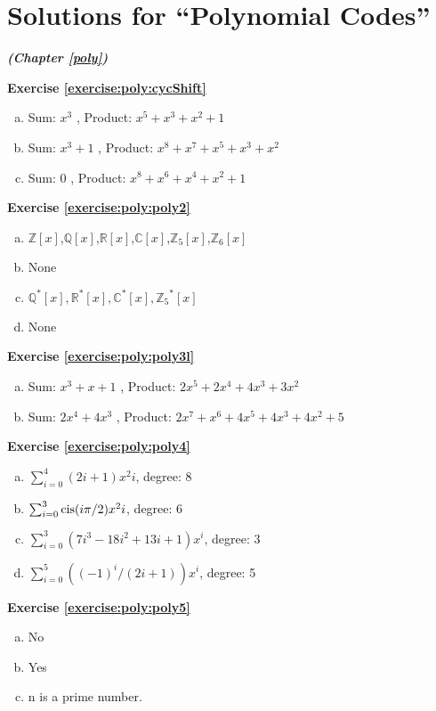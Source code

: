 \section{Solutions for ``Polynomial Codes''}
\noindent\textbf{\textit{ (Chapter \ref{poly})}}\bigskip

\noindent\textbf{Exercise \ref{exercise:poly:cycShift}}
\begin{enumerate} [(a)]
\item
 Sum: $x^3$ , Product: $x^5+x^3+x^2+1$
\item
 Sum: $x^3+1$ , Product: $x^8+x^7+x^5+x^3+x^2$
\item
 Sum: $0$ , Product: $x^8+x^6+x^4+x^2+1$
\end{enumerate}

\noindent\textbf{Exercise \ref{exercise:poly:poly2}}
\begin{enumerate} [(a)]
\item
 $\mathbb{Z}[x]$,$\mathbb{Q}[x]$,$\mathbb{R}[x]$,$\mathbb{C}[x]$,$\mathbb{Z}_5[x]$,$\mathbb{Z}_6[x]$
\item
 None
\item
 $\mathbb{Q}^*[x],\mathbb{R}^*[x], \mathbb{C}^*[x], {\mathbb{Z}_5}^*[x]$
\item
 None
\end{enumerate}

\noindent\textbf{Exercise \ref{exercise:poly:poly3l}}
\begin{enumerate} [(a)]
\item
 Sum: $x^3+x+1$ , Product: $2x^5+2x^4+4x^3+3x^2$
\item
 Sum: $2x^4+4x^3$ , Product: $2x^7+x^6+4x^5+4x^3+4x^2+5$
\end{enumerate}

\noindent\textbf{Exercise \ref{exercise:poly:poly4}}
\begin{enumerate} [(a)]
\item
 $\sum_{i=0}^{4} (2i+1)x^2i$, degree: 8
\item
 $\sum_{i=0}^{3} \operatorname{cis}(i\pi/2)x^2i$, degree: 6
\item 
$\sum_{i=0}^{3} (7i^3-18i^2+13i+1)x^i$, degree: 3
\item
 $\sum_{i=0}^{5} ((-1)^i/(2i+1))x^i$, degree: 5
\end{enumerate}

\noindent\textbf{Exercise \ref{exercise:poly:poly5}}
\begin{enumerate} [(a)]
\item
 No
\item 
Yes
\item
 n is a prime number.
\end{enumerate}

